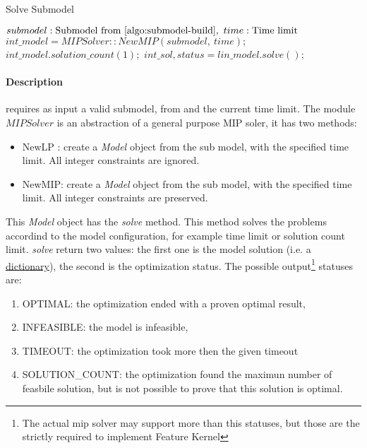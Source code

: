 \begin{algorithm}[H]
    \caption{Solve Submodel}\label{algo:solve-submodel}
    \begin{algorithmic}[1]
        \REQUIRE $submodel: \text{Submodel from \Cref{algo:submodel-build}},\ time: \text{Time limit}$
            \STATE $int\_model = MIPSolver::NewMIP(submodel,\ time);$
            \STATE $int\_model.solution\_count(1);$
            \STATE $int\_sol, status = lin\_model.solve();$
            \ELSE 
            \ENDIF
        \ELSE
        \ENDIF
    \end{algorithmic}
\end{algorithm}

\paragraph{Description}  requires as input a valid submodel, from  and the current time limit. The module $MIPSolver$
is an abstraction of a general purpose MIP soler, it has two methods:
\begin{itemize}
    \item NewLP : create a \emph{Model} object from the sub model, with the specified time limit. All integer constraints are ignored.
    \item NewMIP: create a \emph{Model} object from the sub model, with the specified time limit. All integer constraints are preserved.
\end{itemize}

This \emph{Model} object has the \emph{solve} method. This method solves the problems accordind to the model configuration, for example time limit or solution count limit. 
\emph{solve} return two values: the first one is the model solution (i.e. a \href{https://en.wikipedia.org/wiki/Associative_array}{dictionary}), the second is the optimization
status. The possible output\footnote{The actual mip solver may support more than this statuses, but those are the strictly required to implement Feature Kernel } statuses are: 
\begin{enumerate}
    \item OPTIMAL: the optimization ended with a proven optimal result,
    \item INFEASIBLE: the model is infeasible,
    \item TIMEOUT: the optimization took more then the given timeout
    \item SOLUTION\_COUNT: the optimization found the maximun number of feasbile solution, but is not possible to prove that this solution is optimal.
\end{enumerate}

